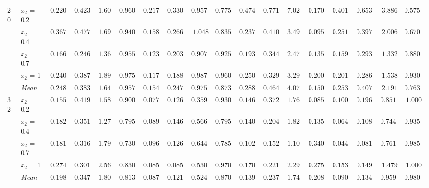 \begin{table}[htbp]
\begin{tabular}{llrrrrrrrrrrrrrrrr}
\multirow{5}{*}{20} & $x_2$ = 0.2 & $0.2209$ & $0.4232$ & $1.602$ & {\boldmath$0.9600$} & {\boldmath$0.2175$} & {\boldmath$0.3302$} & {\boldmath$0.9571$} & $0.7750$ & $0.4742$ & $0.7717$ & $7.023$ & $0.1700$ & $0.4018$ & $0.6536$ & $3.886$ & $0.5750$ \\
 & $x_2$ = 0.4 & $0.3670$ & $0.4777$ & $1.698$ & {\boldmath$0.9400$} & {\boldmath$0.1583$} & {\boldmath$0.2668$} & {\boldmath$1.048$} & $0.8350$ & $0.2371$ & $0.4108$ & $3.496$ & $0.0950$ & $0.2519$ & $0.3973$ & $2.006$ & $0.6700$ \\
 & $x_2$ = 0.7 & $0.1668$ & $0.2468$ & $1.363$ & $0.9550$ & {\boldmath$0.1234$} & {\boldmath$0.2033$} & {\boldmath$0.9071$} & $0.9250$ & $0.1937$ & $0.3449$ & $2.477$ & $0.1350$ & $0.1593$ & $0.2937$ & $1.332$ & {\boldmath$0.8800$} \\
 & $x_2$ = 1 & $0.2401$ & $0.3872$ & $1.896$ & $0.9750$ & {\boldmath$0.1176$} & {\boldmath$0.1889$} & {\boldmath$0.9879$} & $0.9600$ & $0.2507$ & $0.3298$ & $3.290$ & $0.2000$ & $0.2019$ & $0.2862$ & $1.538$ & {\boldmath$0.9300$} \\
 & \textit{Mean} & $0.2487$ & $0.3837$ & $1.640$ & $0.9575$ & \colorbox{green!20}{\boldmath$0.1542$} & \colorbox{green!20}{\boldmath$0.2473$} & \colorbox{green!20}{\boldmath$0.9751$} & \colorbox{green!20}{\boldmath$0.8738$} & $0.2889$ & $0.4643$ & $4.071$ & $0.1500$ & $0.2537$ & $0.4077$ & $2.191$ & $0.7638$ \\
\midrule
\multirow{5}{*}{32} & $x_2$ = 0.2 & $0.1554$ & $0.4195$ & $1.583$ & {\boldmath$0.9000$} & {\boldmath$0.0772$} & {\boldmath$0.1269$} & {\boldmath$0.3591$} & $0.9300$ & $0.1465$ & $0.3727$ & $1.766$ & $0.0850$ & $0.1004$ & $0.1968$ & $0.8511$ & $1.000$ \\
 & $x_2$ = 0.4 & $0.1826$ & $0.3516$ & $1.278$ & $0.7950$ & $0.0897$ & $0.1462$ & {\boldmath$0.5662$} & $0.7950$ & $0.1404$ & $0.2041$ & $1.828$ & $0.1350$ & {\boldmath$0.0645$} & {\boldmath$0.1089$} & $0.7446$ & {\boldmath$0.9350$} \\
 & $x_2$ = 0.7 & $0.1814$ & $0.3164$ & $1.794$ & $0.7300$ & $0.0961$ & $0.1260$ & {\boldmath$0.6441$} & $0.7850$ & $0.1021$ & $0.1524$ & $1.100$ & $0.3400$ & {\boldmath$0.0446$} & {\boldmath$0.0814$} & $0.7610$ & {\boldmath$0.9850$} \\
 & $x_2$ = 1 & $0.2744$ & $0.3014$ & $2.562$ & $0.8300$ & {\boldmath$0.0851$} & {\boldmath$0.0856$} & {\boldmath$0.5300$} & {\boldmath$0.9700$} & $0.1705$ & $0.2213$ & $2.294$ & $0.2750$ & $0.1532$ & $0.1498$ & $1.479$ & $1.000$ \\
 & \textit{Mean} & $0.1984$ & $0.3472$ & $1.804$ & $0.8137$ & \colorbox{green!20}{\boldmath$0.0870$} & \colorbox{green!20}{\boldmath$0.1212$} & \colorbox{green!20}{\boldmath$0.5249$} & \colorbox{green!20}{\boldmath$0.8700$} & $0.1399$ & $0.2376$ & $1.747$ & $0.2088$ & $0.0907$ & $0.1342$ & $0.9590$ & $0.9800$ \\
\bottomrule
\end{tabular}
\end{table}
